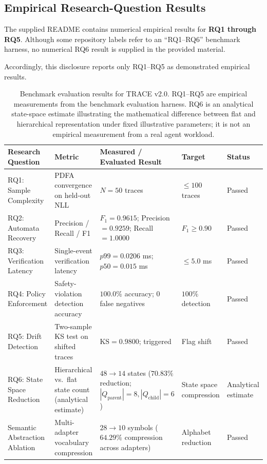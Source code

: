 \documentclass[11pt,a4paper]{article}
\begin{document}
\subsection{Empirical Research-Question Results}

The supplied README contains numerical empirical results for \textbf{RQ1 through RQ5}.
Although some repository labels refer to an ``RQ1--RQ6'' benchmark harness, no numerical
RQ6 result is supplied in the provided material.

Accordingly, this disclosure reports only RQ1--RQ5 as demonstrated empirical results.

\begin{table}[!htbp]
\centering
\small
\renewcommand{\arraystretch}{1.25}
\begin{tabular}{L{3.1cm} L{3.7cm} L{3.7cm} L{2.2cm} C{1.3cm}}
\toprule
\textbf{Research Question} &
\textbf{Metric} &
\textbf{Measured / Evaluated Result} &
\textbf{Target} &
\textbf{Status} \\
\midrule

RQ1: Sample Complexity &
PDFA convergence on held-out NLL &
$N=50$ traces &
$\leq 100$ traces &
Passed \\

RQ2: Automata Recovery &
Precision / Recall / F1 &
$F_1=0.9615$; Precision $=0.9259$; Recall $=1.0000$ &
$F_1\geq0.90$ &
Passed \\

RQ3: Verification Latency &
Single-event verification latency &
$p99=0.0206$ ms; $p50=0.015$ ms &
$\leq5.0$ ms &
Passed \\

RQ4: Policy Enforcement &
Safety-violation detection accuracy &
$100.0\%$ accuracy; 0 false negatives &
$100\%$ detection &
Passed \\

RQ5: Drift Detection &
Two-sample KS test on shifted traces &
$\mathrm{KS}=0.9800$; triggered &
Flag shift &
Passed \\
\midrule

RQ6: State Space Reduction &
Hierarchical vs.\ flat state count (analytical estimate) &
$48 \to 14$ states ($70.83\%$ reduction; $|Q_{\text{parent}}|=8, |Q_{\text{child}}|=6$) &
State space compression &
Analytical estimate \\

\midrule

Semantic Abstraction Ablation &
Multi-adapter vocabulary compression &
$28 \to 10$ symbols ($64.29\%$ compression across adapters) &
Alphabet reduction &
Passed \\

\bottomrule
\end{tabular}

\caption{Benchmark evaluation results for TRACE v2.0. RQ1--RQ5 are empirical measurements
from the benchmark evaluation harness. RQ6 is an analytical state-space estimate illustrating
the mathematical difference between flat and hierarchical representation under fixed illustrative
parameters; it is not an empirical measurement from a real agent workload.}
\label{tab:benchmarks}
\end{table}
\end{document}
